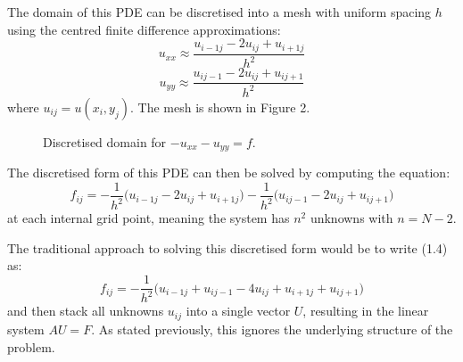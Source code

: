 \documentclass{article}
\numberwithin{equation}{section}
\begin{document}
The domain of this PDE can be discretised into a mesh with uniform spacing $h$ using the centred finite difference approximations:
	\begin{equation} 
	u_{xx} \approx \frac{u_{i-1j} - 2u_{ij} + u_{i+1j}}{h^2}
	\end{equation}
	\begin{equation}
	u_{yy} \approx \frac{u_{ij-1} - 2u_{ij} + u_{ij+1}}{h^2}
	\end{equation}
where $u_{ij} = u(x_i, y_j)$. The mesh is shown in Figure 2.

\begin{figure}[H]
\centering
\caption{Discretised domain for $-u_{xx}-u_{yy}=f$.}
\end{figure}

The discretised form of this PDE can then be solved by computing the equation:
	\begin{equation}
	f_{ij} = -\frac{1}{h^2} \big( u_{i-1j} - 2u_{ij} + u_{i+1j} \big) - \frac{1}{h^2} \big( u_{ij-1} - 2u_{ij} + u_{ij+1} \big)
	\end{equation}
at each internal grid point, meaning the system has $n^2$ unknowns with $n=N-2$. 

The traditional approach to solving this discretised form would be to write (1.4) as:
	\begin{equation}
	f_{ij} = -\frac{1}{h^2} \big( u_{i-1j} + u_{ij-1} - 4u_{ij} + u_{i+1j} + u_{ij+1}  \big)
	\end{equation}
and then stack all unknowns $u_{ij}$ into a single vector $U$, resulting in the linear system $AU=F$. As stated previously, this ignores the underlying structure of the problem.
\end{document}
